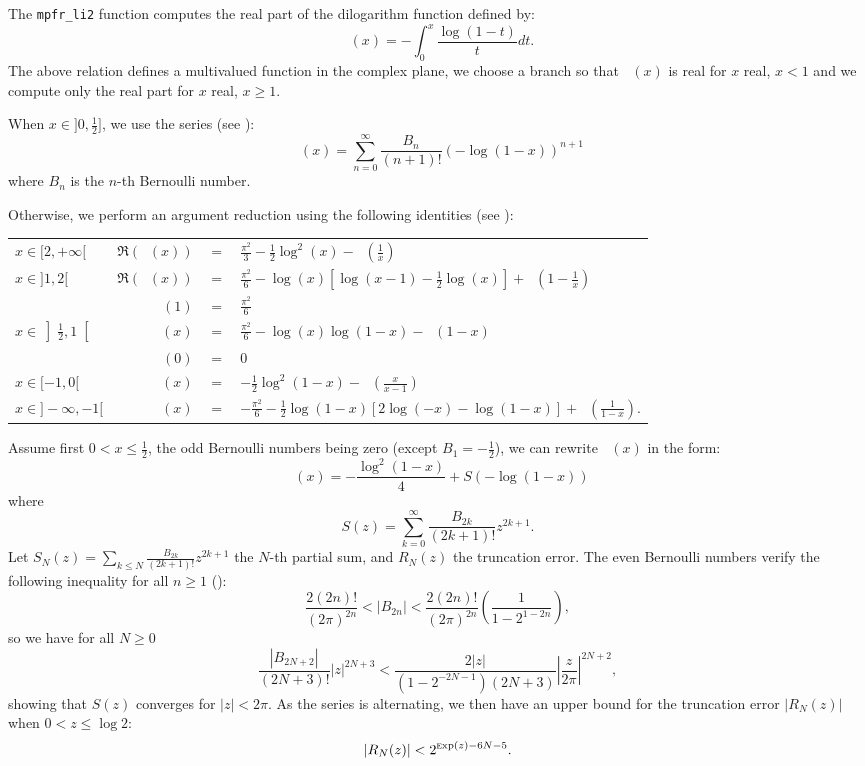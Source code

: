 \documentclass[12pt]{amsart}
\DeclareMathOperator{\LiTwo}{Li_2}
\def\Exp{{\rm \textsc exp}}
\begin{document}
The \texttt{mpfr\_li2} function computes the real part of the dilogarithm
function defined by:
\[
\LiTwo(x) = - \int_0^x \frac{\log(1-t)}{t} dt.
\]
The above relation defines a multivalued function in the complex plane, we
choose a branch so that $\LiTwo(x)$ is real for $x$ real, $x < 1$ and we compute
only the real part for $x$ real, $x \geq 1$.

When $x \in ]0, \frac{1}{2}]$, we use the series 
(see \cite[Eq. (5)]{VoWe05}):
\[
\LiTwo(x) = \sum_{n=0}^{\infty} \frac{B_n}{(n+1)!} (-\log(1-x))^{n+1}
\]
where $B_n$ is the $n$-th Bernoulli number.

Otherwise, we perform an argument reduction using the following identities 
(see \cite{GiZa75}):

\begin{tabular}{l r c l}
$x \in [2, +\infty[ $&$ \Re(\LiTwo(x)) $&$=$&$ \frac{\pi^2}{3}
- \frac{1}{2}\log^2(x) - \LiTwo\left(\frac{1}{x}\right) $\\
$x \in ]1, 2[ $&$ \Re(\LiTwo(x)) $&$=$&$ \frac{\pi^2}{6}-\log(x)\left[\log(x-1)
- \frac{1}{2} \log(x)\right] + \LiTwo\left(1 - \frac{1}{x}\right)  $\\
 &$ \LiTwo(1) $&$=$&$ \frac{\pi^2}{6} $\\
$x \in \left]\frac{1}{2}, 1\right[ $&$ \LiTwo(x) $&$=$&$ \frac{\pi^2}{6}
- \log(x) \log(1 - x) - \LiTwo(1 - x) $\\
 &$ \LiTwo(0) $&$=$&$ 0 $\\
$x \in [-1, 0[ $&$
\LiTwo(x) $&$=$&$ -\frac{1}{2} \log^2(1-x) - \LiTwo\left(\frac{x}{x - 1}\right)$\\
$x \in ]-\infty, -1[ $&$ \LiTwo(x) $&$=$&$ -\frac{\pi^2}{6} 
- \frac{1}{2} \log(1 -x) [2 \log(-x) - \log(1 - x)]
+ \LiTwo\left(\frac{1}{1 - x}\right).$
\end{tabular}


Assume first $0 < x \leq \frac{1}{2}$, the odd Bernoulli numbers being zero
(except $B_1 = -\frac{1}{2}$), we can rewrite $\LiTwo(x)$ in the form:
\[
\LiTwo(x) = - \frac{\log^2(1-x)}{4} + S(-\log(1-x))
\]
where  
\[
S(z) = \sum_{k=0}^{\infty} \frac{B_{2k}}{(2k+1)!} z^{2k+1}.
\]
Let $S_N(z) = \sum_{k \leq N} \frac{B_{2k}}{(2k+1)!} z^{2k+1}$ the $N$-th
partial sum, and $R_N(z)$ the truncation error.
The even Bernoulli numbers verify the following inequality 
for all $n \geq 1$ (\cite[Inequalities 23.1.15]{AbSt73}):
\[
\frac{2(2n)!}{(2\pi)^{2n}} < \left|B_{2n}\right|
< \frac{2(2n)!}{(2\pi)^{2n}} \left(\frac{1}{1 - 2^{1-2n}}\right),
\]
so we have for all $N \geq 0$
\[
\frac{|B_{2N+2}|}{(2N+3)!}|z|^{2N+3} <
\frac{2|z|}{(1-2^{-2N-1})(2N+3)} \left|\frac{z}{2 \pi}\right|^{2N+2},
\]
showing that $S(z)$ converges for $|z| < 2 \pi$.
As the series is alternating, we then have an upper bound for the truncation
error $|R_N(z)|$ when $0 < z \leq \log 2$:
\[
|R_N(z)| < 2^{\Exp(z)-6N-5}.
\]
\end{document}

